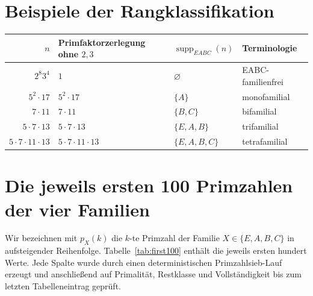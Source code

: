 \documentclass[11pt,a4paper,reqno]{amsart}
\theoremstyle{definition}
\theoremstyle{remark}
\newcommand{\suppE}{\operatorname{supp}_{EABC}}
\begin{document}
\section{Beispiele der Rangklassifikation}

\begin{center}
\begin{tabular}{rlll}
\toprule
$n$ & Primfaktorzerlegung ohne $2,3$ & $\suppE(n)$ & Terminologie \\
\midrule
$2^8 3^4$ & $1$ & $\varnothing$ & EABC-familienfrei \\
$5^2\cdot17$ & $5^2\cdot17$ & $\{A\}$ & monofamilial \\
$7\cdot11$ & $7\cdot11$ & $\{B,C\}$ & bifamilial \\
$5\cdot7\cdot13$ & $5\cdot7\cdot13$ & $\{E,A,B\}$ & trifamilial \\
$5\cdot7\cdot11\cdot13$ & $5\cdot7\cdot11\cdot13$ & $\{E,A,B,C\}$ & tetrafamilial \\
\bottomrule
\end{tabular}
\end{center}

\section{Die jeweils ersten 100 Primzahlen der vier Familien}

Wir bezeichnen mit $p_X(k)$ die $k$-te Primzahl der Familie $X\in\{E,A,B,C\}$ in aufsteigender Reihenfolge. Tabelle~\ref{tab:first100} enthält die jeweils ersten hundert Werte. Jede Spalte wurde durch einen deterministischen Primzahlsieb-Lauf erzeugt und anschließend auf Primalität, Restklasse und Vollständigkeit bis zum letzten Tabelleneintrag geprüft.
\end{document}
